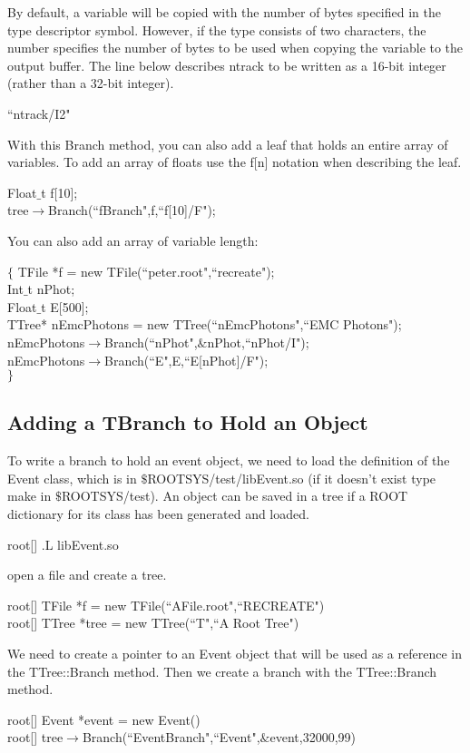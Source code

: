 \documentclass[12pt,a4paper]{article}
\begin{document}
By default, a variable will be copied with the number of bytes specified in the type descriptor symbol. However, if the type consists of two characters, the number specifies the number of bytes to be used when copying the variable to the output buffer. The line below describes ntrack to be written as a 16-bit integer (rather than a 32-bit integer).

``ntrack/I2"

With this Branch method, you can also add a leaf that holds an entire array of variables. To add an array of floats use the f[n] notation when describing the leaf.

Float$\_$t f[10]; \\
tree$\rightarrow$Branch(``fBranch",f,``f[10]/F");

You can also add an array of variable length:

$\{$
TFile *f = new TFile(``peter.root",``recreate"); \\
Int$\_$t nPhot; \\
Float$\_$t E[500]; \\
TTree* nEmcPhotons = new TTree(``nEmcPhotons",``EMC Photons"); \\
nEmcPhotons$\rightarrow$Branch(``nPhot",$\&$nPhot,``nPhot/I"); \\
nEmcPhotons$\rightarrow$Branch(``E",E,``E[nPhot]/F"); \\
$\}$

\subsection{Adding a TBranch to Hold an Object}
To write a branch to hold an event object, we need to load the definition of the Event class, which is in $\$$ROOTSYS/test/libEvent.so (if it doesn’t exist type make in $\$$ROOTSYS/test). An object can be saved in a tree if a ROOT dictionary for its class has been generated and loaded.

root[] .L libEvent.so

open a file and create a tree.

root[] TFile *f = new TFile(``AFile.root",``RECREATE") \\
root[] TTree *tree = new TTree(``T",``A Root Tree")

We need to create a pointer to an Event object that will be used as a reference in the TTree::Branch method. Then we create a branch with the TTree::Branch method.

root[] Event *event = new Event() \\
root[] tree$\rightarrow$Branch(``EventBranch",``Event",$\&$event,32000,99)
\end{document}
